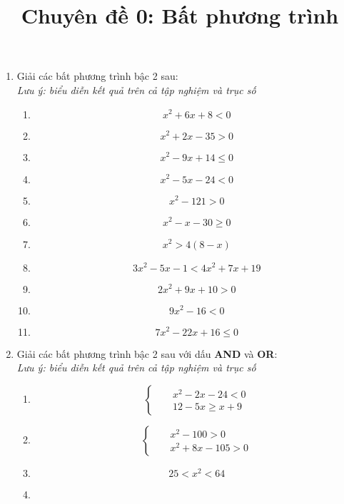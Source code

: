 \documentclass{article}
\title{Chuyên đề 0: Bất phương trình}
\begin{document}
\maketitle
\begin{enumerate}[start=1,label={\bfseries Bài tập \arabic*:},leftmargin=1in]
\item Giải các bất phương trình bậc 2 sau:\\
\textit{Lưu ý: biểu diễn kết quả trên cả tập nghiệm và trục số}
\begin{enumerate}
    \item $$x^2+6x+8<0$$
    \item $$x^2+2x-35>0$$
    \item $$x^2-9x+14\leq0$$
    \item $$x^2-5x-24<0$$
    \item $$x^2-121>0$$
    \item $$x^2-x-30\geq0$$
    \item $$x^2>4(8-x)$$
    \item $$3x^2-5x-1<4x^2+7x+19$$
    \item $$2x^2+9x+10>0$$
    \item $$9x^2-16<0$$
    \item $$7x^2-22x+16\leq0$$
\end{enumerate}
\newpage
\item Giải các bất phương trình bậc 2 sau với dấu \textbf{AND} và \textbf{OR}:
\\ \textit{Lưu ý: biểu diễn kết quả trên cả tập nghiệm và trục số}
\begin{enumerate}
    \item \begin{equation*}
        \left\{\begin{aligned}
            &&x^2-2x-24<0\\
            &&12-5x\geq x+9
        \end{aligned}\right.
    \end{equation*}
    \item \begin{equation*}
        \left\{\begin{aligned}
            &&x^2-100>0\\
            &&x^2+8x-105>0
        \end{aligned}\right.
    \end{equation*}
    \item $$25<x^2<64$$
    \item \begin{equation*}

\end{equation*}
\end{enumerate}
\end{enumerate}
\end{document}
